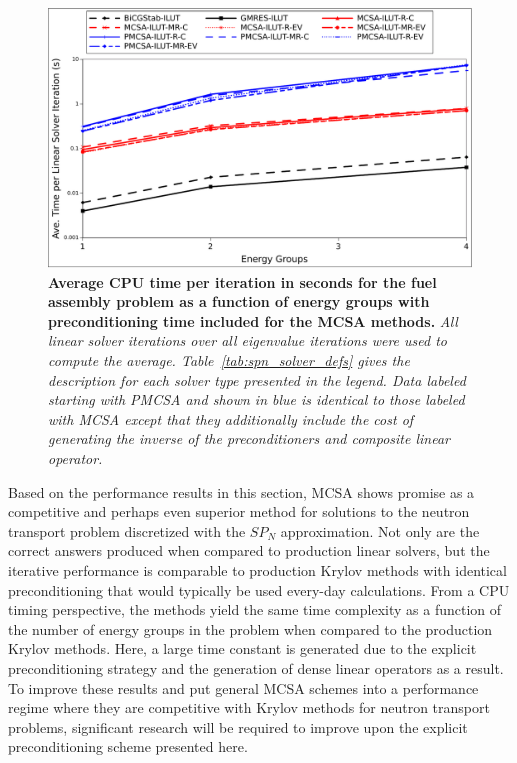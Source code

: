 \begin{figure}[t!]
  \begin{center}
    \includegraphics[width=5in]{chapters/spn_equations/solver_p_time.pdf}
  \end{center}
  \caption{\textbf{Average CPU time per iteration in seconds for the
      fuel assembly problem as a function of energy groups with
      preconditioning time included for the MCSA methods.}
    \textit{All linear solver iterations over all eigenvalue
      iterations were used to compute the
      average. Table~\ref{tab:spn_solver_defs} gives the description
      for each solver type presented in the legend. Data labeled
      starting with PMCSA and shown in blue is identical to those
      labeled with MCSA except that they additionally include the cost
      of generating the inverse of the preconditioners and composite
      linear operator.}}
  \label{fig:spn_comparison_prec_time}
\end{figure}

Based on the performance results in this section, MCSA shows promise
as a competitive and perhaps even superior method for solutions to the
neutron transport problem discretized with the $SP_N$
approximation. Not only are the correct answers produced when compared
to production linear solvers, but the iterative performance is
comparable to production Krylov methods with identical preconditioning
that would typically be used every-day calculations. From a CPU timing
perspective, the methods yield the same time complexity as a function
of the number of energy groups in the problem when compared to the
production Krylov methods. Here, a large time constant is generated
due to the explicit preconditioning strategy and the generation of
dense linear operators as a result. To improve these results and put
general MCSA schemes into a performance regime where they are
competitive with Krylov methods for neutron transport problems,
significant research will be required to improve upon the explicit
preconditioning scheme presented here.

